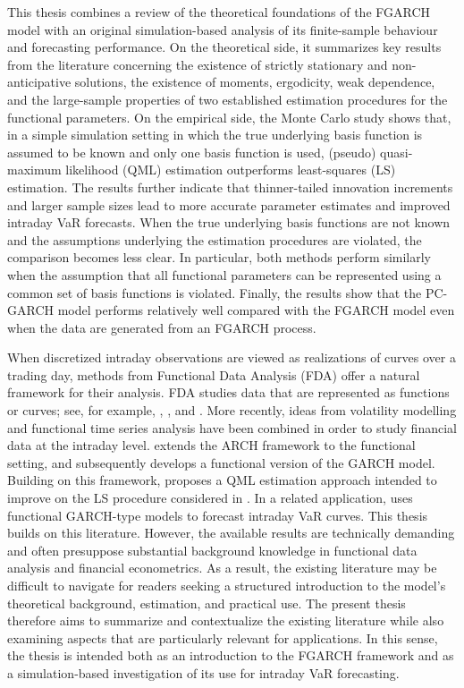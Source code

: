 \documentclass[12pt,a4paper]{article}
\theoremstyle{definition}
\begin{document}
This thesis combines a review of the theoretical foundations of the FGARCH model with an original simulation-based analysis of its finite-sample behaviour and forecasting performance. On the theoretical side, it summarizes key results from the literature concerning the existence of strictly stationary and non-anticipative solutions, the existence of moments, ergodicity, weak dependence, and the large-sample properties of two established estimation procedures for the functional parameters. On the empirical side, the Monte Carlo study shows that, in a simple simulation setting in which the true underlying basis function is assumed to be known and only one basis function is used, (pseudo) quasi-maximum likelihood (QML) estimation outperforms least-squares (LS) estimation. The results further indicate that thinner-tailed innovation increments and larger sample sizes lead to more accurate parameter estimates and improved intraday VaR forecasts. When the true underlying basis functions are not known and the assumptions underlying the estimation procedures are violated, the comparison becomes less clear. In particular, both methods perform similarly when the assumption that all functional parameters can be represented using a common set of basis functions is violated. Finally, the results show that the PC-GARCH model performs relatively well compared with the FGARCH model even when the data are generated from an FGARCH process.

When discretized intraday observations are viewed as realizations of curves over a trading day, methods from Functional Data Analysis (FDA) offer a natural framework for their analysis. FDA studies data that are represented as functions or curves; see, for example, \citet{Ramsay2005}, \citet{hsing2015theoretical}, and \citet{kokoszka2017introduction}. More recently, ideas from volatility modelling and functional time series analysis have been combined in order to study financial data at the intraday level. \citet{hormann2013functional} extends the ARCH framework to the functional setting, and \citet{Aue2017} subsequently develops a functional version of the GARCH model. Building on this framework, \citet{Cerovecki2019} proposes a QML estimation approach intended to improve on the LS procedure considered in \citet{Aue2017}. In a related application, \citet{RICE20201023} uses functional GARCH-type models to forecast intraday VaR curves. This thesis builds on this literature. However, the available results are technically demanding and often presuppose substantial background knowledge in functional data analysis and financial econometrics. As a result, the existing literature may be difficult to navigate for readers seeking a structured introduction to the model’s theoretical background, estimation, and practical use. The present thesis therefore aims to summarize and contextualize the existing literature while also examining aspects that are particularly relevant for applications. In this sense, the thesis is intended both as an introduction to the FGARCH framework and as a simulation-based investigation of its use for intraday VaR forecasting.
\end{document}

